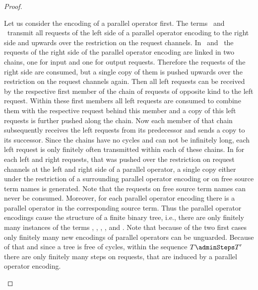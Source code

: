 \documentclass[]{llncs}
\begin{document}
\begin{proof}
\begin{description}
			Let us consider the encoding of a parallel operator first. The terms \processLeftOutputRequests \ and \processLeftInputRequests \ transmit all requests of the left side of a parallel operator encoding to the right side and upwards over the restriction on the request channels. In \processRightOutputRequests \ and \processRightInputRequests \ the requests of the right side of the parallel operator encoding are linked in two chains, one for input and one for output requests. Therefore the requests of the right side are consumed, but a single copy of them is pushed upwards over the restriction on the request channels again. Then all left requests can be received by the respective first member of the chain of requests of opposite kind to the left request. Within these first members all left requests are consumed to combine them with the respective request behind this member and a copy of this left requests is further pushed along the chain. Now each member of that chain subsequently receives the left requests from its predecessor and sends a copy to its successor. Since the chains have no cycles and can not be infinitely long, each left request is only finitely often transmitted within each of these chains. In \pushRequests for each left and right requests, that was pushed over the restriction on request channels at the left and right side of a parallel operator, a single copy either under the restriction of a surrounding parallel operator encoding or on free source term names is generated. Note that the requests on free source term names can never be consumed. Moreover, for each parallel operator encoding there is a parallel operator in the corresponding source term. Thus the parallel operator encodings cause the structure of a finite binary tree, i.e., there are only finitely many instances of the terms \processLeftOutputRequests, \processLeftInputRequests, \processRightOutputRequests, \processRightInputRequests, and \pushRequests. Note that because of the two first cases only finitely many new encodings of parallel operators can be unguarded. Because of that and since a tree is free of cycles, within the sequence $ T \adminSteps T' $ there are only finitely many steps on requests, that are induced by a parallel operator encoding.
			

\end{description}
\end{proof}
\end{document}
